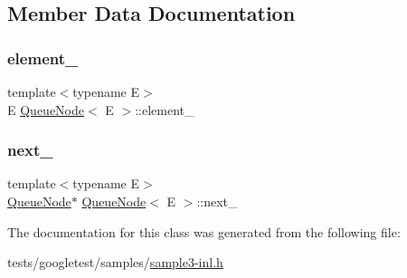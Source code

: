 \subsection{Member Data Documentation}
\mbox{\label{classQueueNode_a593f0f5862848c1e9063d32ea3438b58}} 
\subsubsection{\texorpdfstring{element\+\_\+}{element\_}}
{\footnotesize\ttfamily template$<$typename E$>$ \\
E \hyperlink{classQueueNode}{Queue\+Node}$<$ E $>$\+::element\+\_\+\hspace{0.3cm}{\ttfamily [private]}}

\mbox{\label{classQueueNode_a7434603f6c25418f7810f041752876bd}} 
\subsubsection{\texorpdfstring{next\+\_\+}{next\_}}
{\footnotesize\ttfamily template$<$typename E$>$ \\
\hyperlink{classQueueNode}{Queue\+Node}$\ast$ \hyperlink{classQueueNode}{Queue\+Node}$<$ E $>$\+::next\+\_\+\hspace{0.3cm}{\ttfamily [private]}}



The documentation for this class was generated from the following file\+:\begin{DoxyCompactItemize}
\item 
tests/googletest/samples/\hyperlink{sample3-inl_8h}{sample3-\/inl.\+h}\end{DoxyCompactItemize}
